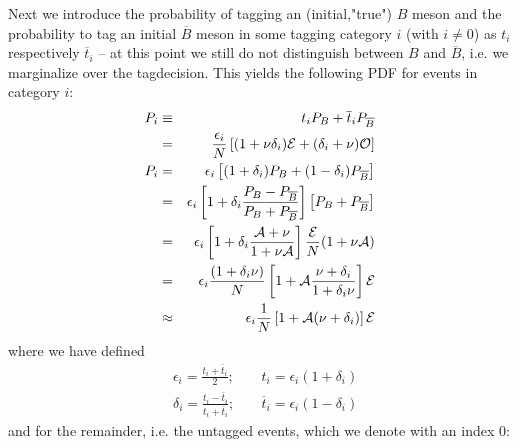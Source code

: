 \documentclass[a4paper,10pt,twosided]{article}
\begin{document}
Next we introduce the probability of tagging an (initial,"true") $B$ meson  and
the probability to tag an initial $\overline{B}$ meson in some tagging category $i$ (with $i\ne 0$) as $t_i$
respectively $\overline{t}_i$ -- at this point we still do not distinguish between $B$ and $\overline{B}$, i.e.
we marginalize over the tagdecision.  This yields the following PDF for events in category $i$:
\begin{eqnarray}
     P_i & \equiv & t_i P_B + \overline{t}_i P_{\overline B}  \nonumber
\\       &      = & \frac{\epsilon_i}{N} \left[ (1+\nu\delta_i ){\cal E}+(\delta_i + \nu){\cal O} \right] 
\\  P_i  &      = & \epsilon_i \left[ (1+\delta_i ) P_B + (1-\delta_i) P_{\overline{B}} \right]
\\       &      = & \epsilon_i \left[ 1+ \delta_i \frac{ P_B -  P_{\overline{B}}}{ P_B +  P_{\overline{B}}} \right]\left[ P_B + P_{\overline{B}}  \right]
\\       &      = & \epsilon_i\left[1 +\delta_i \frac{{\cal A}+ \nu}{1+\nu{\cal A} } \right] \frac{\cal E}{N}( 1 + \nu {\cal A} ) 
\\       &      = & \epsilon_i \frac{ (1+\delta_i\nu )}{N} \left[1+{\cal A}\frac{\nu+\delta_i}{1+\delta_i\nu} \right] {\cal E}
\\       & \approx& \epsilon_i \frac{ 1 }{N} \left[1+{\cal A}(\nu+\delta_i) \right] {\cal E}
\end{eqnarray}
where we have defined
\begin{eqnarray}
   &\epsilon_i = \frac{ t_i + \overline{t}_i }{2};\;\;\;\;  & t_i = \epsilon_i( 1 + \delta_i ) \\
   &\delta_i = \frac{t_i - \overline{t}_i}{t_i + \overline{t}_i}; & \overline{t}_i = \epsilon_i( 1 - \delta_i ) 
\end{eqnarray}
and for the remainder, i.e. the untagged events, which we denote with an index $0$:
\end{document}
